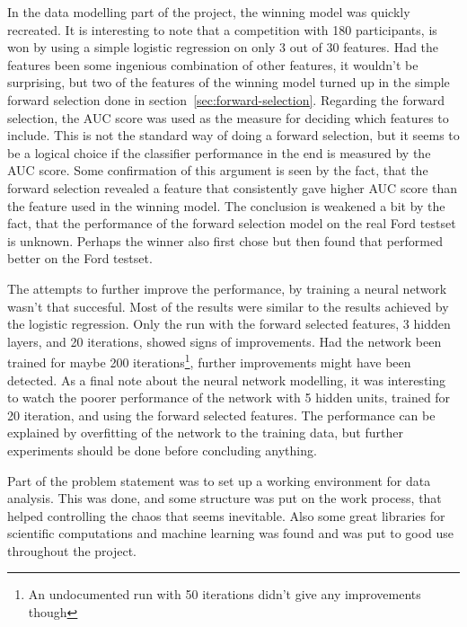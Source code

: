 In the data modelling part of the project, the winning model was quickly recreated. It is interesting to note that a competition with 180 participants, is won by using a simple logistic regression on only 3 out of 30 features. Had the features been some ingenious combination of other features, it wouldn't be surprising, but two of the features of the winning model turned up in the simple forward selection done in section~\ref{sec:forward-selection}. Regarding the forward selection, the AUC score was used as the measure for deciding which features to include. This is not the standard way \citep{meetings-morten} of doing a forward selection, but it seems to be a logical choice if the classifier performance in the end is measured by the AUC score. Some confirmation of this argument is seen by the fact, that the forward selection revealed a feature  that consistently gave higher AUC score than the feature  used in the winning model. The conclusion is weakened a bit by the fact, that the performance of the forward selection model on the real Ford testset is unknown. Perhaps the winner also first chose  but then found that  performed better on the Ford testset. \par

The attempts to further improve the performance, by training a neural network wasn't that succesful. Most of the results were similar to the results achieved by the logistic regression. Only the run with the forward selected features, 3 hidden layers, and 20 iterations, showed signs of improvements. Had the network been trained for maybe 200 iterations\footnote{An undocumented run with 50 iterations didn't give any improvements though}, further improvements might have been detected. As a final note about the neural network modelling, it was interesting to watch the poorer performance of the network with 5 hidden units, trained for 20 iteration, and using the forward selected features. The performance can be explained by overfitting of the network to the training data, but further experiments should be done before concluding anything. \par

Part of the problem statement was to set up a working environment for data analysis. This was done, and some structure was put on the work process, that helped controlling the chaos that seems inevitable. Also some great libraries for scientific computations and machine learning was found and was put to good use throughout the project.
